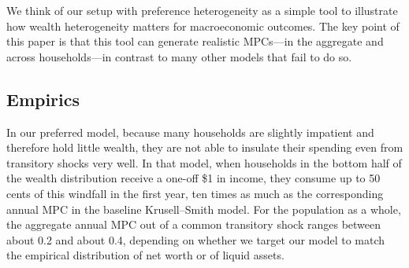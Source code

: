 \documentclass[12pt,titlepage]{econtex}
\begin{document}
We think of our setup with preference heterogeneity as a simple tool to illustrate
how wealth heterogeneity matters for macroeconomic outcomes. The key point of this paper is that this tool can generate realistic MPCs---in the aggregate and across households---in contrast to many other models that fail to do so. 


\subsection{Empirics}  \label{ssEmpirics}

In our preferred model, because many households are slightly
impatient and therefore hold little wealth, they are not able to
insulate their spending even from transitory shocks very well. In that model, when
households in the bottom half of the wealth distribution receive a
one-off \$1 in income, they consume up to 50 cents of this windfall in
the first year, ten times as much as the corresponding annual MPC in the
baseline Krusell--Smith model. For the population as a whole, the
aggregate annual MPC out of a common transitory shock ranges between
about 0.2 and about 0.4, depending on whether we target our model to match the empirical distribution
of net worth or of liquid assets.%
\end{document}
